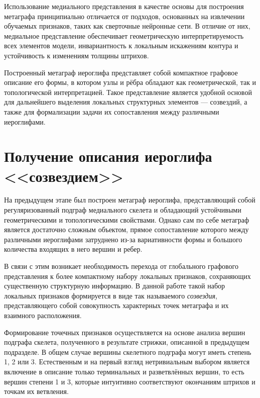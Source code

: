 Использование медиального представления в качестве основы для построения метаграфа принципиально отличается от подходов, основанных на извлечении обучаемых признаков, таких как сверточные нейронные сети. В отличие от них, медиальное представление обеспечивает геометрическую интерпретируемость всех элементов модели, инвариантность к локальным искажениям контура и устойчивость к изменениям толщины штрихов.

Построенный метаграф иероглифа представляет собой компактное графовое описание его формы, в котором узлы и рёбра обладают как геометрической, так и топологической интерпретацией. Такое представление является удобной основой для дальнейшего выделения локальных структурных элементов — созвездий, а также для формализации задачи их сопоставления между различными иероглифами.

\section{Получение описания иероглифа <<созвездием>>}\label{sec:ch3/sec3}
На предыдущем этапе был построен метаграф иероглифа, представляющий собой регуляризованный подграф медиального скелета и обладающий устойчивыми геометрическими и топологическими свойствами. Однако сам по себе метаграф является достаточно сложным объектом, прямое сопоставление которого между различными иероглифами затруднено из-за вариативности формы и большого количества входящих в него вершин и ребер.

В связи с этим возникает необходимость перехода от глобального графового представления к более компактному набору локальных признаков, сохраняющих существенную структурную информацию. В данной работе такой набор локальных признаков формируется в виде так называемого \emph{созвездия}, представляющего собой совокупность характерных точек метаграфа и их взаимного расположения.

Формирование точечных признаков осуществляется на основе анализа вершин подграфа скелета, полученного в результате стрижки, описанной в предыдущем подразделе. В общем случае вершины скелетного подграфа могут иметь степень 1, 2 или 3. Естественным и на первый взгляд нетривиальным выбором является включение в описание только терминальных и разветвлённых вершин, то есть вершин степени 1 и 3, которые интуитивно соответствуют окончаниям штрихов и точкам их ветвления.

